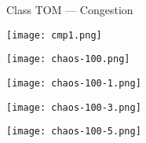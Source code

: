 \begin{frame}[fragile]{Class TOM --- Congestion}
\noindent
\centerline{\texttt{[image: cmp1.png]}}


\end{frame}
\begin{frame}[fragile]{ }
\noindent
\centerline{\texttt{[image: chaos-100.png]}}
\end{frame}
\begin{frame}[fragile]{ }
\centerline{\texttt{[image: chaos-100-1.png]}}
\end{frame}
\begin{frame}[fragile]{ }
\noindent
\centerline{\texttt{[image: chaos-100-3.png]}}
\end{frame}
\begin{frame}[fragile]{ }
\centerline{\texttt{[image: chaos-100-5.png]}}


\end{frame}

